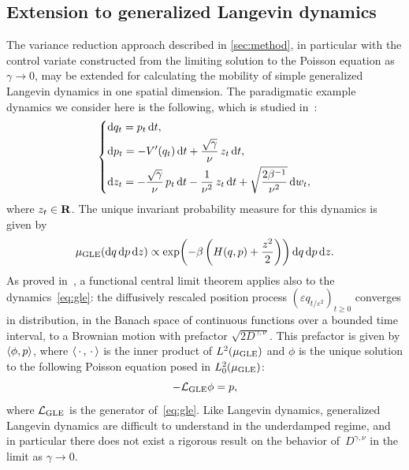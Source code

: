 \documentclass[11pt,a4paper]{article}
\begin{document}
\subsection{Extension to generalized Langevin dynamics}%
\label{sub:generalization_to_generalized_langevin_dynamics}
The variance reduction approach described in \cref{sec:method},
in particular with the control variate constructed from the limiting solution to the Poisson equation as $\gamma \to 0$,
may be extended for calculating the mobility of simple generalized Langevin dynamics in one spatial dimension.
The paradigmatic example dynamics we consider here is the following,
which is studied in~\cite{MR2793823,GPGSUV21}:
\begin{equation}
\label{eq:gle}
\left\{
  \begin{aligned}
      & \mathrm d q_t = p_t \, \mathrm d t, \\
      & \mathrm d p_t = - V'(q_t) \, \mathrm d t + \frac{\sqrt{\gamma}}{\nu} \, z_t \, \mathrm d t, \\
      & \mathrm d z_t = - \frac{\sqrt{\gamma}}{\nu} \, p_t  \, \mathrm d t
      -   \frac{1}{\nu^2} \, z_t \, \mathrm d t + \sqrt{\frac{2 \beta^{-1}}{\nu^2}} \, \mathrm d w_t,
  \end{aligned}
\right.
\end{equation}
where $z_t \in \mathbf R$.
The unique invariant probability measure for this dynamics is given by
\[
    \mu_{\rm GLE}(\mathrm d q \, \mathrm d p \, \mathrm d z) \propto \exp \biggl( - \beta \left( H(q,p) + \frac{z^2}{2} \right) \biggr) \, \mathrm d q \, \mathrm d p \, \mathrm d z.
\]
As proved in~\cite{ottobre2012asymptotic},
a functional central limit theorem applies also to the dynamics~\eqref{eq:gle}:
the diffusively rescaled position process $(\varepsilon q_{t/\varepsilon^2})_{t \geq 0}$ converges in distribution,
in the Banach space of continuous functions over a bounded time interval,
to a Brownian motion with prefactor $\sqrt{2 D^{\gamma, \nu}}$.
This prefactor is given by $\ip{\phi}{p}$, where $\ip{\dummy}{\dummy}$ is the inner product of $L^2(\mu_{\rm GLE})$
and $\phi$ is the unique solution to the following Poisson equation posed in $L^2_0(\mu_{\rm GLE})$:
\begin{equation}
    \label{eq:poisson_gle}
    - \mathcal L_{\rm GLE} \phi = p,
\end{equation}
where $\mathcal L_{\rm GLE}$ is the generator of~\eqref{eq:gle}.
Like Langevin dynamics, generalized Langevin dynamics are difficult to understand in the underdamped regime,
and in particular there does not exist a rigorous result on the behavior of~$D^{\gamma, \nu}$ in the limit as $\gamma \to 0$.
\end{document}
